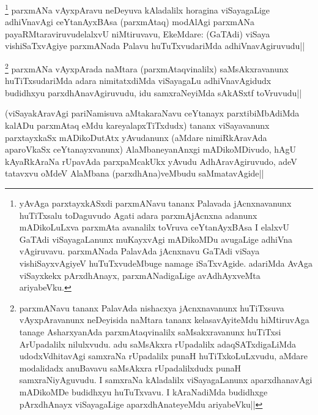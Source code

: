 
\begin{artha}
\footnote[1]{yAvAga parxtayxkASxdi parxmANavu tananx Palavada jAcnxnavanunx huTiTxsalu toDaguvudo Agati adara parxmAjAcnxna adanunx mADikoLuLxva parxmAta avanalilx toVruva ceYtanAyxBAsa I elalxvU GaTAdi viSayagaLanunx muKayxvAgi mADikoMDu avugaLige adhiVna vAgiruvavu. parxmANada PalavAda jAcnxnavu GaTAdi viSaya vishiSayxvAgiyeV huTuTxvudeMbuge namage iSaTxvAgide. adariMda AvAga viSayxkekx pArxdhAnayx, parxmANadigaLige avAdhAyxveMta ariyabeVku.} parxmANa vAyxpAravu neDeyuva kAladalilx horagina viSayagaLige adhiVnavAgi ceYtanAyxBAsa (parxmAtaq) modAlAgi parxmANa payaRMtaraviruvudelalxvU niMtiruvavu, EkeMdare: (GaTAdi) viSaya vishiSaTxvAgiye parxmANada Palavu huTuTxvudariMda adhiVnavAgiruvudu||
\end{artha}


\begin{artha}
\footnote[2]{parxmANavu tananx PalavAda nishacxya jAcnxnavanunx huTiTxsuva vAyxpAravanunx neDeyisida naMtara tananx kelasavAyiteMdu hiMtiruvAga tanage AsharxyanAda parxmAtaqvinalilx saMsakxravanunx huTiTxsi ArUpadalilx nilulxvudu. adu saMsAkxra rUpadalilx adaqSATxdigaLiMda udodxVdhitavAgi samxraNa rUpadalilx punaH huTiTxkoLuLxvudu, aMdare modalidadx anuBavavu saMsAkxra rUpadalilxdudx punaH samxraNiyAguvudu. I samxraNa kAladalilx viSayagaLanunx aparxdhanavAgi mADikoMDe budidhxyu huTuTxvavu. I kAraNadiMda budidhxge pArxdhAnayx viSayagaLige aparxdhAnateyeMdu ariyabeVku||} parxmANa vAyxpArada naMtara (parxmAtaqvinalilx) saMsAkxravanunx huTiTxsudariMda adara nimitatxdiMda viSayagaLu adhiVnavAgidudx budidhxyu parxdhAnavAgiruvudu, idu samxraNeyiMda sAkASxtf toVruvudu||
\end{artha}


\begin{artha}
(viSayakAravAgi pariNamisuva aMtakaraNavu ceYtanayx parxtibiMbAdiMda kalADu parxmAtaq eMdu kareyalapxTiTxdudx) tananx viSayavanunx parxtayxkaSx mADikoDutAtx yAvudanunx (aMdare nimiRkAravAda aparoVkaSx ceYtanayxvanunx) AlaMbaneyanAnxgi mADikoMDivudo, hAgU kAyaRkAraNa rUpavAda parxpaMcakUkx yAvudu AdhAravAgiruvudo, adeV tatavxvu oMdeV AlaMbana (parxdhAna)veMbudu saMmatavAgide||
\end{artha}

